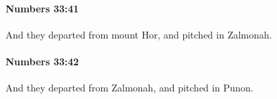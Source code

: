 		\paragraph{Numbers 33:41} %
			\label{NUMBERS-33-41}

			And they departed from mount Hor, and pitched in Zalmonah.


		\paragraph{Numbers 33:42} %
			\label{NUMBERS-33-42}

			And they departed from Zalmonah, and pitched in Punon.


